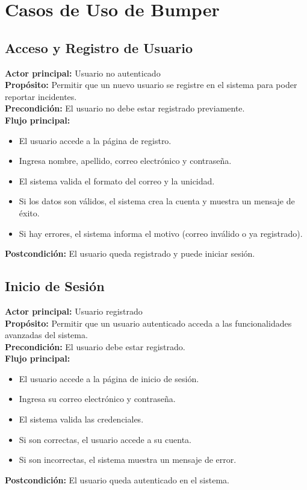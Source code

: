 \section{Casos de Uso de Bumper}

\subsection{Acceso y Registro de Usuario}
\textbf{Actor principal:} Usuario no autenticado\\
\textbf{Propósito:} Permitir que un nuevo usuario se registre en el sistema para poder reportar incidentes.\\
\textbf{Precondición:} El usuario no debe estar registrado previamente.\\
\textbf{Flujo principal:}
\begin{itemize}
    \item El usuario accede a la página de registro.
    \item Ingresa nombre, apellido, correo electrónico y contraseña.
    \item El sistema valida el formato del correo y la unicidad.
    \item Si los datos son válidos, el sistema crea la cuenta y muestra un mensaje de éxito.
    \item Si hay errores, el sistema informa el motivo (correo inválido o ya registrado).
\end{itemize}
\textbf{Postcondición:} El usuario queda registrado y puede iniciar sesión.

\subsection{Inicio de Sesión}
\textbf{Actor principal:} Usuario registrado\\
\textbf{Propósito:} Permitir que un usuario autenticado acceda a las funcionalidades avanzadas del sistema.\\
\textbf{Precondición:} El usuario debe estar registrado.\\
\textbf{Flujo principal:}
\begin{itemize}
    \item El usuario accede a la página de inicio de sesión.
    \item Ingresa su correo electrónico y contraseña.
    \item El sistema valida las credenciales.
    \item Si son correctas, el usuario accede a su cuenta.
    \item Si son incorrectas, el sistema muestra un mensaje de error.
\end{itemize}
\textbf{Postcondición:} El usuario queda autenticado en el sistema.

